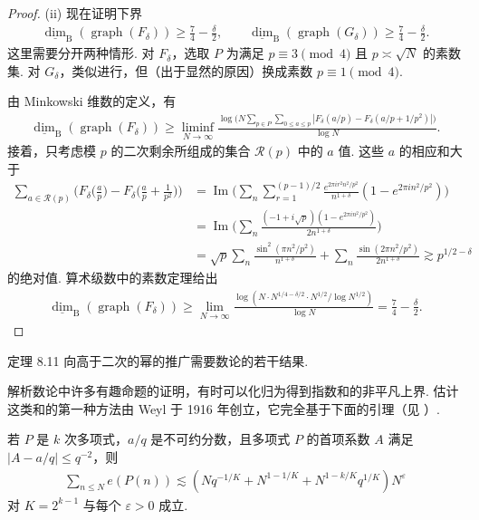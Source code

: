 \begin{proof}
(ii) 现在证明下界
\begin{align*}
  \underline{\dim}_{\mathrm{B}}(\operatorname{graph}(F_{\delta}))\geq\frac{7}{4}-\frac{\delta}{2},\qquad
  \underline{\dim}_{\mathrm{B}}(\operatorname{graph}(G_{\delta}))\geq\frac{7}{4}-\frac{\delta}{2}.
\end{align*}
这里需要分开两种情形. 对 $F_{\delta}$，选取 $P$ 为满足 $p \equiv 3 \pmod 4$ 且 $p \asymp \sqrt{N}$ 的素数集. 对 $G_{\delta}$，类似进行，但（出于显然的原因）换成素数 $p \equiv 1 \pmod 4$.

由 Minkowski 维数的定义，有
\begin{align*}
  \underline{\dim}_{\mathrm{B}}(\operatorname{graph}(F_{\delta}))
  \geq\liminf_{N\to\infty}\frac{\log\bigl(N\sum_{p\in P}\sum_{0\leq a\leq p}|F_{\delta}(a/p)-F_{\delta}(a/p+1/p^{2})|\bigr)}{\log N}.
\end{align*}
接着，只考虑模 $p$ 的二次剩余所组成的集合 $\mathcal{R}(p)$ 中的 $a$ 值. 这些 $a$ 的相应和大于
\begin{align*}
  \sum_{a\in\mathcal{R}(p)}\Big(F_{\delta}\Big(\frac{a}{p}\Big)-F_{\delta}\Big(\frac{a}{p}+\frac{1}{p^{2}}\Big)\Big)
  &=\operatorname{Im}\Big(\sum_{n}\sum_{r=1}^{(p-1)/2}\frac{e^{2\pi i r^{2}n^{2}/p^{2}}}{n^{1+\delta}}
   \left(1-e^{2\pi i n^{2}/p^{2}}\right)\Big)\\
  &=\operatorname{Im}\Big(\sum_{n}\frac{(-1+i\sqrt{p})\left(1-e^{2\pi i n^{2}/p^{2}}\right)}{2n^{1+\delta}}\Big)\\
  &=\sqrt{p}\sum_{n}\frac{\sin^{2}(\pi n^{2}/p^{2})}{n^{1+\delta}}
   +\sum_{n}\frac{\sin(2\pi n^{2}/p^{2})}{2n^{1+\delta}}
  \gtrsim p^{1/2-\delta}
\end{align*}
的绝对值. 算术级数中的素数定理给出
\begin{align*}
  \underline{\dim}_{\mathrm{B}}(\operatorname{graph}(F_{\delta}))
  \geq\lim_{N\to\infty}\frac{\log\left(N\cdot N^{1/4-\delta/2}\cdot N^{1/2}/\log N^{1/2}\right)}{\log N}
  =\frac{7}{4}-\frac{\delta}{2}.
\end{align*}
\end{proof}

定理 8.11 向高于二次的幂的推广需要数论的若干结果.

解析数论中许多有趣命题的证明，有时可以化归为得到指数和的非平凡上界. 估计这类和的第一种方法由 Weyl 于 1916 年创立，它完全基于下面的引理（见 \cite{b196}）.

\begin{lemma}\label{lem:8.12}
若 $P$ 是 $k$ 次多项式，$a/q$ 是不可约分数，且多项式 $P$ 的首项系数 $A$ 满足 $|A - a/q| \leq q^{-2}$，则
\begin{align*}
  \sum_{n\leq N}e\left(P(n)\right)
  \lesssim\left(N q^{-1/K}+N^{1-1/K}+N^{1-k/K}q^{1/K}\right)N^{\varepsilon}
\end{align*}
对 $K = 2^{k-1}$ 与每个 $\varepsilon > 0$ 成立.
\end{lemma}

